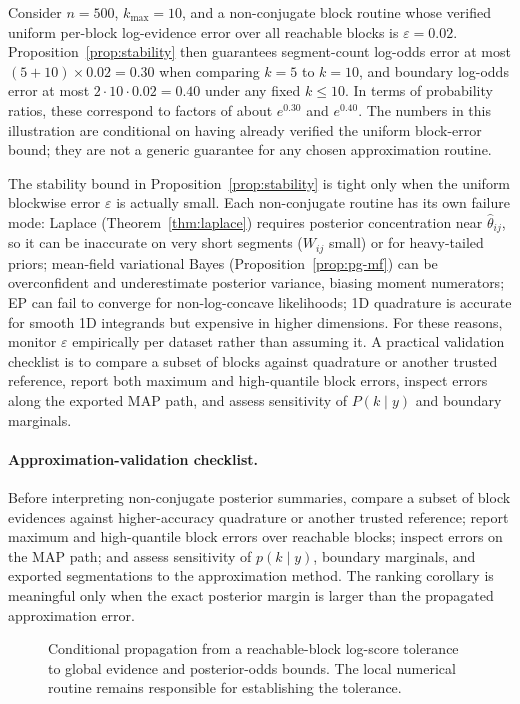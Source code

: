 \begin{remark}
\label{rem:stability-numerical}
Consider $n=500$, $k_{\max}=10$, and a non-conjugate block routine whose verified uniform
per-block log-evidence error over all reachable blocks is $\varepsilon=0.02$. Proposition~\ref{prop:stability}
then guarantees segment-count log-odds error at most $(5+10)\times0.02=0.30$ when comparing
$k=5$ to $k=10$, and boundary log-odds error at most $2\cdot10\cdot0.02=0.40$ under any fixed
$k\le10$. In terms of probability ratios, these correspond to factors of about $e^{0.30}$ and
$e^{0.40}$. The numbers in this illustration are conditional on having already verified the
uniform block-error bound; they are not a generic guarantee for any chosen approximation routine.
\end{remark}

\begin{remark}
\label{rem:failure-modes}
The stability bound in Proposition~\ref{prop:stability} is tight only when the uniform blockwise
error $\varepsilon$ is actually small. Each non-conjugate routine has its own failure mode:
Laplace (Theorem~\ref{thm:laplace}) requires posterior concentration near $\hat\theta_{ij}$, so
it can be inaccurate on very short segments ($W_{ij}$ small) or for heavy-tailed priors;
mean-field variational Bayes (Proposition~\ref{prop:pg-mf}) can be overconfident and
underestimate posterior variance, biasing moment numerators; EP can fail to converge for
non-log-concave likelihoods; 1D quadrature is accurate for smooth 1D integrands but expensive
in higher dimensions. For these reasons, monitor $\varepsilon$ empirically per
dataset rather than assuming it. A practical validation checklist is to compare a subset of blocks against
quadrature or another trusted reference, report both maximum and high-quantile block errors, inspect
errors along the exported MAP path, and assess sensitivity of $P(k\mid y)$ and boundary marginals.
\end{remark}

\paragraph{Approximation-validation checklist.}
Before interpreting non-conjugate posterior summaries, compare a subset of block evidences against
higher-accuracy quadrature or another trusted reference; report maximum and high-quantile block
errors over reachable blocks; inspect errors on the MAP path; and assess sensitivity of $p(k\mid y)$,
boundary marginals, and exported segmentations to the approximation method. The ranking corollary
is meaningful only when the exact posterior margin is larger than the propagated approximation error.


\begin{figure}[H]
\centering
\resizebox{0.96\textwidth}{!}{}
\caption{Conditional propagation from a reachable-block log-score tolerance to global evidence and posterior-odds bounds. The local numerical routine remains responsible for establishing the tolerance.}
\label{fig:local-global-stability}
\end{figure}
